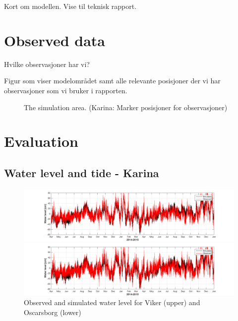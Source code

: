 \documentclass[12pt,a4paper,english]{article}
\begin{document}
Kort om modellen. Vise til teknisk rapport.


\section{Observed data}


Hvilke observasjoner har vi?

Figur som viser modelomr\aa det samt alle relevante posisjoner der vi har observasjoner som vi bruker i rapporten.

\begin{figure}[t]
\centerline{
}
\caption{\small
The simulation area. (Karina: Marker posisjoner for observasjoner)}
\label{fig:kart}
\end{figure}



\clearpage
\section{Evaluation}
\subsection{Water level and tide - Karina}

\begin{figure}[t]
\centerline{
\includegraphics*[trim=3cm 0cm 2.5cm 0cm,clip=true,width=\textwidth]{Figurer/Viker_WL} 
}
\centerline{
\includegraphics*[trim=3cm 0cm 2.5cm 0cm,clip=true,width=\textwidth]{Figurer/Oscarsborg_WL}
}
\caption{\small
Observed and simulated water level for Viker (upper) and Oscarsborg (lower)}
\label{fig:Waterlevel}
\end{figure}
\end{document}
